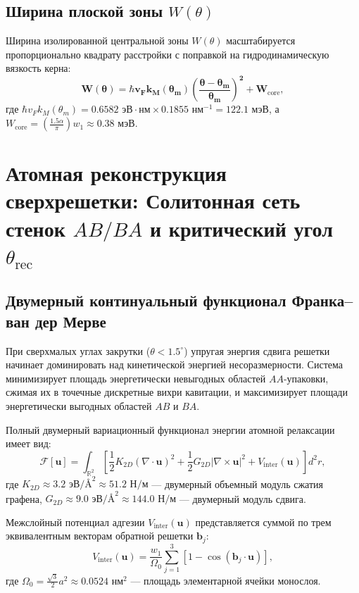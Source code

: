 \documentclass[12pt,a4paper]{article}
\begin{document}
\subsection{Ширина плоской зоны $W(\theta)$}
Ширина изолированной центральной зоны $W(\theta)$ масштабируется пропорционально квадрату расстройки с поправкой на гидродинамическую вязкость керна:
\begin{equation}
	\mathbf{W(\theta) = \hbar v_F k_M(\theta_m) \left( \frac{\theta - \theta_m}{\theta_m} \right)^2 + W_{\mathrm{core}}},
\end{equation}
где $\hbar v_F k_M(\theta_m) = 0.6582\text{ эВ}\cdot\text{нм} \times 0.1855\text{ нм}^{-1} = \mathbf{122.1\text{ мэВ}}$, а $W_{\text{core}} = \left(\frac{1.5\alpha}{\pi}\right) w_1 \approx \mathbf{0.38\text{ мэВ}}$.

\section{Атомная реконструкция сверхрешетки: Солитонная сеть стенок $AB/BA$ и критический угол $\theta_{\mathrm{rec}}$}

\subsection{Двумерный континуальный функционал Франка--ван дер Мерве}
При сверхмалых углах закрутки ($\theta < 1.5^\circ$) упругая энергия сдвига решетки начинает доминировать над кинетической энергией несоразмерности. Система минимизирует площадь энергетически невыгодных областей $AA$-упаковки, сжимая их в точечные дискретные вихри кавитации, и максимизирует площади энергетически выгодных областей $AB$ и $BA$.

Полный двумерный вариационный функционал энергии атомной релаксации имеет вид:
\begin{equation}
	\mathcal{F}[\mathbf{u}] = \int_{\mathbb{R}^2} \left[ \frac{1}{2} K_{2D} (\nabla \cdot \mathbf{u})^2 + \frac{1}{2} G_{2D} |\nabla \times \mathbf{u}|^2 + V_{\text{inter}}(\mathbf{u}) \right] d^2r,
\end{equation}
где $K_{2D} \approx 3.2\text{ эВ/\AA}^2 \approx 51.2\text{ Н/м}$ — двумерный объемный модуль сжатия графена, $G_{2D} \approx 9.0\text{ эВ/\AA}^2 \approx 144.0\text{ Н/м}$ — двумерный модуль сдвига.

Межслойный потенциал адгезии $V_{\text{inter}}(\mathbf{u})$ представляется суммой по трем эквивалентным векторам обратной решетки $\mathbf{b}_j$:
\begin{equation}
	V_{\text{inter}}(\mathbf{u}) = \frac{w_1}{\Omega_0} \sum_{j=1}^3 \left[ 1 - \cos(\mathbf{b}_j \cdot \mathbf{u}) \right],
\end{equation}
где $\Omega_0 = \frac{\sqrt{3}}{2} a^2 \approx 0.0524\text{ нм}^2$ — площадь элементарной ячейки монослоя.
\end{document}
